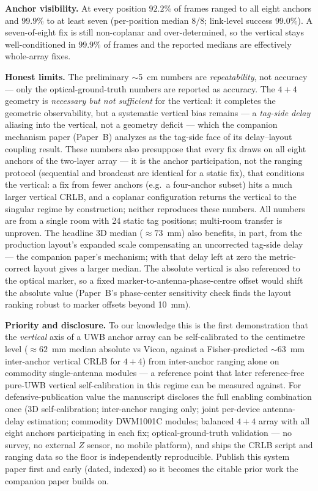 \documentclass[10pt,a4paper]{article}
\begin{document}
\textbf{Anchor visibility.} At every position $92.2\%$ of frames ranged to all eight anchors and
$99.9\%$ to at least seven (per-position median $8/8$; link-level success $99.0\%$). A seven-of-eight fix is still non-coplanar and over-determined, so the vertical stays
well-conditioned in $99.9\%$ of frames and the reported medians are effectively whole-array fixes.

\textbf{Honest limits.} The preliminary $\sim$5~cm numbers are \emph{repeatability}, not accuracy ---
only the optical-ground-truth numbers are reported as accuracy. The $4{+}4$ geometry is
\emph{necessary but not sufficient} for the vertical: it completes the geometric observability, but
a systematic vertical bias remains --- a \emph{tag-side delay} aliasing into the vertical, not a
geometry deficit --- which the companion mechanism paper (Paper~B) analyzes as the tag-side face of
its delay--layout coupling result. These numbers also presuppose that every fix draws on all eight anchors of the two-layer
array --- it is the anchor participation, not the ranging protocol (sequential and broadcast are
identical for a static fix), that conditions the vertical: a fix from fewer anchors (e.g.\ a four-anchor
subset) hits a much larger vertical CRLB, and a coplanar configuration returns the vertical to the singular regime by construction; neither reproduces these numbers. All numbers are from a single room with 24 static
tag positions; multi-room transfer is unproven. The headline 3D median (${\approx}73$~mm) also benefits, in part, from the
production layout's expanded scale compensating an uncorrected tag-side delay --- the companion paper's
mechanism; with that delay left at zero the metric-correct layout gives a larger median. The absolute vertical is
also referenced to the optical marker, so a fixed marker-to-antenna-phase-centre offset would shift the
absolute value (Paper~B's phase-center sensitivity check finds the layout ranking robust to marker
offsets beyond 10~mm).

\textbf{Priority and disclosure.} To our knowledge this is the first demonstration that the
\emph{vertical} axis of a UWB anchor array can be self-calibrated to the centimetre level
(${\approx}62$~mm median absolute vs Vicon, against a Fisher-predicted $\sim$63~mm inter-anchor vertical CRLB for $4{+}4$) from
inter-anchor ranging alone on commodity single-antenna modules --- a reference point that later reference-free
pure-UWB vertical self-calibration in this regime can be measured against. For defensive-publication value the manuscript discloses
the full enabling combination once (3D self-calibration; inter-anchor ranging only; joint per-device
antenna-delay estimation; commodity DWM1001C modules; balanced $4{+}4$ array with all eight anchors participating in each fix; optical-ground-truth
validation --- no survey, no external $Z$ sensor, no mobile platform), and ships the CRLB script and
ranging data so the floor is independently reproducible. Publish this system paper first and early
(dated, indexed) so it becomes the citable prior work the companion paper builds on.
\end{document}
